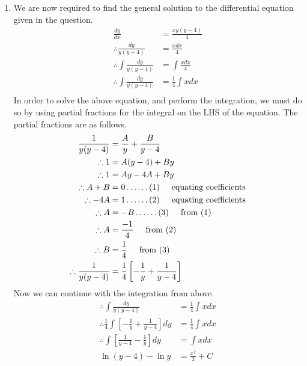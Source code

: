 \documentclass[a4paper]{article}
\begin{document}
\begin{enumerate}[label=\textbf{\arabic*.}]
\begin{enumerate}
		\bigbreak

		\item We are now required to find the general solution to the differential equation given in the question.
		\begin{align*}
		\frac{dy}{dx} & =  \frac{xy(y-4)}{4}\\
		\therefore \frac{dy}{y(y-4)} & =  \frac{xdx}{4}\\
		\therefore \int \frac{dy}{y(y-4)} & = \int \frac{xdx}{4}\\
		\therefore \int \frac{dy}{y(y-4)} & = \frac {1}{4}\int xdx\\
		\end{align*}
		In order to solve the above equation, and perform the integration, we must do so by using partial fractions for the integral on the LHS of the equation. The partial fractions are as follows.
		\begin{align*}
		\frac{1}{y(y-4)} & = \frac{A}{y} + \frac{B}{y-4}\\
		\therefore 1 & = A(y-4) + By\\
		\therefore 1 & = Ay - 4A + By\\
		\therefore A + B & = 0 \dots \dots (1) \hspace{5mm} \text{equating coefficients}\\
		\therefore -4A & = 1 \dots \dots (2) \hspace{5mm} \text{equating coefficients}\\
		\therefore A & = -B \dots \dots (3) \hspace{5mm} \text{from (1)}\\
		\therefore A & = \frac{-1}{4} \hspace{5mm} \text{from (2)}\\
		\therefore B & = \frac{1}{4} \hspace{5mm} \text{from (3)}\\
		\therefore \frac{1}{y(y-4)} & = \frac{1}{4}\left[-\frac{1}{y} + \frac{1}{y-4}\right]\\
		\end{align*}
		Now we can continue with the integration from above.
		\begin{align*}
		\therefore \int \frac{dy}{y(y-4)} & = \frac {1}{4}\int xdx\\
		\therefore \frac{1}{4} \int \left[-\frac{1}{y} + \frac{1}{y-4}\right]dy & = \frac {1}{4}\int xdx\\
		\therefore \int \left[\frac{1}{y-4}-\frac{1}{y}\right]dy & = \int xdx\\
		\ln{(y-4)} - \ln{y} & = \frac{x^2}{2} + C\\

\end{align*}
\end{enumerate}
\end{enumerate}
\end{document}
